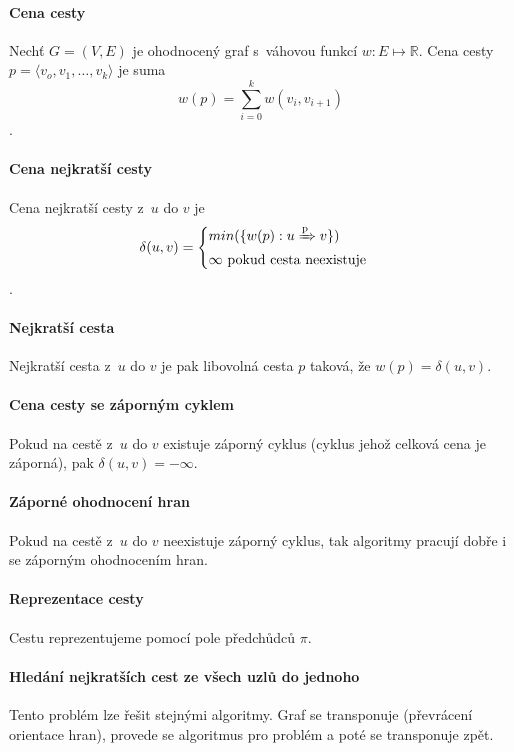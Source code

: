 \paragraph*{Cena cesty} Nechť $G = (V, E)$ je ohodnocený graf s~váhovou funkcí $w: E \mapsto \mathbb{R}$. Cena cesty $p = \langle v_o, v_1, \dots, v_k \rangle$ je suma $$
w(p) = \sum_{i=0}^k w(v_i, v_{i+1})
$$.

\paragraph*{Cena nejkratší cesty} Cena nejkratší cesty z~$u$ do $v$ je $$
\delta(u, v) = \begin{cases}
    min( \{ w(p) : u \xRightarrow{\text{p}} v \} ) \\
    \infty ~ \text{pokud cesta neexistuje}
\end{cases}
$$.

\paragraph*{Nejkratší cesta} Nejkratší cesta z~$u$ do $v$ je pak libovolná cesta $p$ taková, že $w(p) = \delta(u, v)$.

\paragraph*{Cena cesty se záporným cyklem} Pokud na cestě z~$u$ do $v$ existuje záporný cyklus (cyklus jehož celková cena je záporná), pak $\delta(u, v) = - \infty$.

\paragraph*{Záporné ohodnocení hran} Pokud na cestě z~$u$ do $v$ neexistuje záporný cyklus, tak algoritmy pracují dobře i se záporným ohodnocením hran.

\paragraph*{Reprezentace cesty} Cestu reprezentujeme pomocí pole předchůdců $\pi$.

\paragraph*{Hledání nejkratších cest ze všech uzlů do jednoho} Tento problém lze řešit stejnými algoritmy. Graf se transponuje (převrácení orientace hran), provede se algoritmus pro problém  a poté se transponuje zpět.

